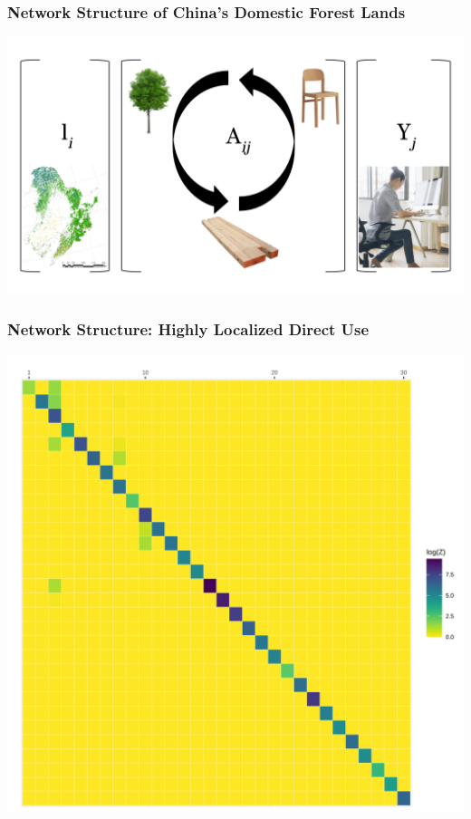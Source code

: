\documentclass[aspectratio=169]{beamer}
\begin{document}
\begin{frame}
     \frametitle{Network Structure of China's Domestic Forest Lands}
     \begin{center}
        \includegraphics[width=0.75\paperwidth]{images/le-mrio-form.png}
     \end{center}
     
\end{frame}


\begin{frame}
     \frametitle{Network Structure: Highly Localized Direct Use}
     \begin{center}
       \includegraphics[width=0.4\paperwidth]{images/heatmap_z_for.png}
     \end{center}
\end{frame}
\end{document}
